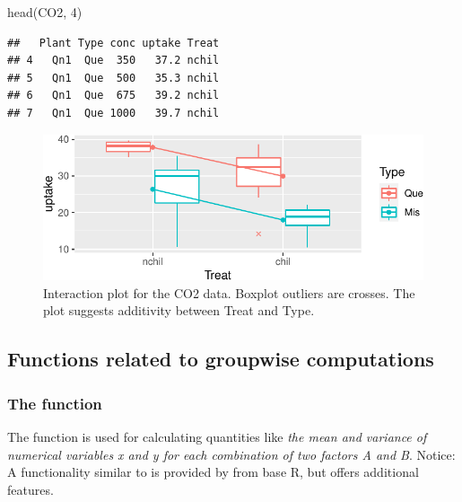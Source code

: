 \documentclass[
]{article}
\newenvironment{Shaded}{\begin{snugshade}}{\end{snugshade}}
\newcommand{\DecValTok}[1]{\textcolor[rgb]{0.00,0.00,0.81}{#1}}
\newcommand{\FunctionTok}[1]{\textcolor[rgb]{0.00,0.00,0.00}{#1}}
\newcommand{\NormalTok}[1]{#1}
\begin{document}
\begin{Shaded}
\begin{Highlighting}[]
\FunctionTok{head}\NormalTok{(CO2, }\DecValTok{4}\NormalTok{)}
\end{Highlighting}
\end{Shaded}

\begin{verbatim}
##   Plant Type conc uptake Treat
## 4   Qn1  Que  350   37.2 nchil
## 5   Qn1  Que  500   35.3 nchil
## 6   Qn1  Que  675   39.2 nchil
## 7   Qn1  Que 1000   39.7 nchil
\end{verbatim}

\begin{figure}
\includegraphics[keepaspectratio]{doby-hojsgaard-fig-interaction-1} \caption{Interaction plot for the CO2 data. Boxplot outliers are crosses. The plot suggests additivity between Treat and Type.}\label{fig:interaction}
\end{figure}

\hypertarget{functions-related-to-groupwise-computations}{%
\subsection{Functions related to groupwise
computations}\label{functions-related-to-groupwise-computations}}

\hypertarget{the-function}{%
\subsubsection{\texorpdfstring{The 
function}{The  function}}\label{the-function}}

The  function is used for calculating quantities like
\emph{the mean and variance of numerical variables x and y for each
combination of two factors A and B}. Notice: A functionality similar to
 is provided by  from base R, but
 offers additional features.
\end{document}
